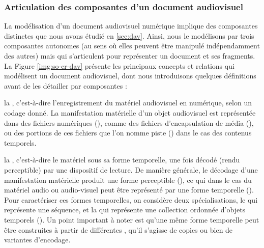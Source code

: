 \subsubsection{Articulation des composantes d'un document audiovisuel}\label{sec:opus}
La modélisation d'un document audiovisuel numérique implique des composantes distinctes que nous avons étudié en \ref{sec:dav}. 
Ainsi, nous le modélisons par trois composantes autonomes (au sens où elles peuvent être manipulé indépendamment des autres) mais qui s'articulent pour représenter un document et ses fragments. 
La Figure \ref{img:so-cr-dav} présente les principaux concepts et relations qui modélisent un document audiovisuel, dont nous introduisons quelques définitions avant de les détailler par composantes : 
\begin{liste}
	\item la , c'est-à-dire l'enregistrement du matériel audiovisuel en numérique, selon un codage donné.
	La manifestation matérielle d'un objet audiovisuel est représentée dans des fichiers numériques (), comme des fichiers d'encapsulation de média (), ou des portions de ces fichiers que l'on nomme piste () dans le cas des contenus temporels.

	\item la , c'est-à-dire le matériel sous sa forme temporelle, une fois décodé (rendu perceptible) par une dispositif de lecture. 
	De manière générale, le décodage d'une manifestation matérielle produit une forme perceptible (), ce qui dans le cas du matériel audio ou audio-visuel peut être représenté par une forme temporelle ().
	Pour caractériser ces formes temporelles, on considère deux spécialisations, le  qui représente une séquence, et la  qui représente une collection ordonnée d'objets temporels ().
	Un point important à noter est qu'une même forme temporelle peut être construites à partir de différentes , qu'il s'agisse de copies ou bien de variantes d'encodage. 
	

\end{liste}
